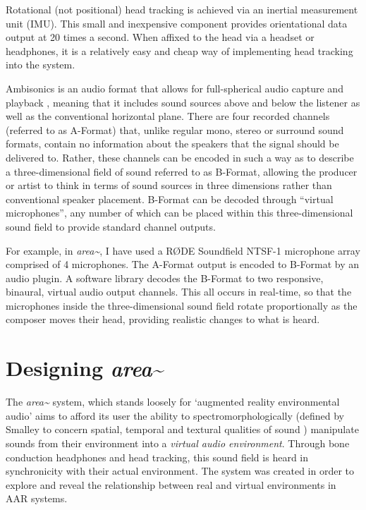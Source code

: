 Rotational (not positional) head tracking is achieved via an inertial measurement unit (IMU). This small and inexpensive component provides orientational data output at 20 times a second. When affixed to the head via a headset or headphones, it is a relatively easy and cheap way of implementing head tracking into the system.

Ambisonics is an audio format that allows for full-spherical audio capture and playback \citep{gerzon1973}, meaning that it includes sound sources above and below the listener as well as the conventional horizontal plane. There are four recorded channels (referred to as A-Format) that, unlike regular mono, stereo or surround sound formats, contain no information about the speakers that the signal should be delivered to. Rather, these channels can be encoded in such a way as to describe a three-dimensional field of sound referred to as B-Format, allowing the producer or artist to think in terms of sound sources in three dimensions rather than conventional speaker placement. B-Format can be decoded through “virtual microphones”, any number of which can be placed within this three-dimensional sound field to provide standard channel outputs.

For example, in \textit{area\textasciitilde{}}, I have used a RØDE Soundfield NTSF-1 microphone array comprised of 4 microphones. The A-Format output is encoded to B-Format by an audio plugin. A software library decodes the B-Format to two responsive, binaural, virtual audio output channels. This all occurs in real-time, so that the microphones inside the three-dimensional sound field rotate proportionally as the composer moves their head, providing realistic changes to what is heard.



\section{Designing \textit{area\textasciitilde{}}} \label{sec: area-system}
The \textit{\textit{area\textasciitilde{}}}  system, which stands loosely for ‘augmented reality environmental audio’ aims to afford its user the ability to spectromorphologically (defined by Smalley to concern spatial, temporal and textural qualities of sound \citeyearpar{smalley1997}) manipulate sounds from their environment into a \textit{virtual audio environment}. Through bone conduction headphones and head tracking, this sound field is heard in synchronicity with their actual environment. The system was created in order to explore and reveal the relationship between real and virtual environments in AAR systems.

